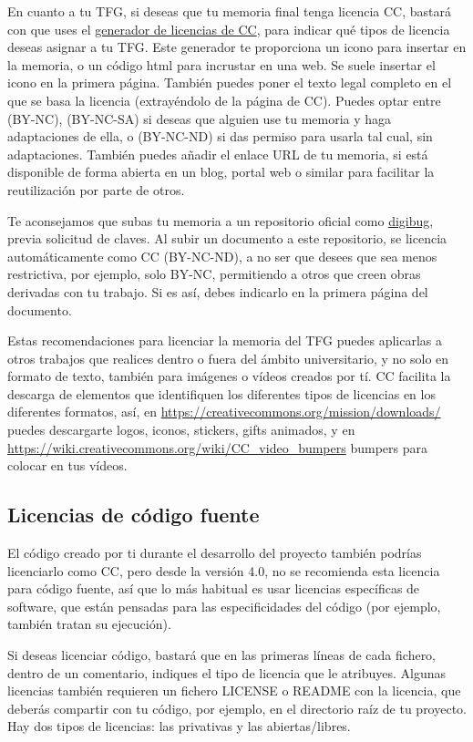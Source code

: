 
En cuanto a tu TFG, si deseas que tu memoria final tenga licencia CC, bastará con que uses el \href{https://chooser-beta.creativecommons.org/}{generador de licencias de CC}, para indicar qué tipos de licencia deseas asignar a tu TFG. Este generador te proporciona un icono para insertar en la memoria, o un código html para incrustar en una web. Se suele insertar el icono en la primera página. También puedes poner el texto legal completo en el que se basa la licencia (extrayéndolo de la página de CC). Puedes optar entre (BY-NC), (BY-NC-SA) si deseas que alguien use tu memoria y haga adaptaciones de ella, o (BY-NC-ND) si das permiso para usarla tal cual, sin adaptaciones. También puedes añadir el enlace URL de tu memoria, si está disponible de forma abierta en un blog, portal web o similar para facilitar la reutilización por parte de otros. 

Te aconsejamos que subas tu memoria a un repositorio oficial como \href{https://digibug.ugr.es/password-login}{digibug}, previa solicitud de claves. Al subir un documento a este repositorio, se licencia automáticamente como CC (BY-NC-ND), a no ser que desees que sea menos restrictiva, por ejemplo, solo BY-NC, permitiendo a otros que creen obras derivadas con tu trabajo. Si es así, debes indicarlo en la primera página del documento. 

Estas recomendaciones para licenciar la memoria del TFG puedes aplicarlas a otros trabajos que realices dentro o fuera del ámbito universitario, y no solo en formato de texto, también para imágenes o vídeos creados por tí. CC facilita la descarga de elementos que identifiquen los diferentes tipos de licencias en los diferentes formatos, así, en \url{https://creativecommons.org/mission/downloads/} puedes descargarte logos, iconos, stickers, gifts animados, y en \url{https://wiki.creativecommons.org/wiki/CC_video_bumpers} bumpers para colocar en tus vídeos.

\subsection{Licencias de código fuente}

El código creado por ti durante el desarrollo del proyecto también podrías licenciarlo como CC, pero desde la versión 4.0, no se recomienda esta licencia para código fuente, así que lo más habitual es usar licencias específicas de software, que están pensadas para las especificidades del código (por ejemplo, también tratan su  ejecución). 

Si deseas licenciar código, bastará que en las primeras líneas de cada fichero, dentro de un comentario, indiques el tipo de licencia que le atribuyes. Algunas licencias también requieren un fichero LICENSE o README con la licencia, que deberás compartir con tu código, por ejemplo, en el directorio raíz de tu proyecto. Hay dos tipos de licencias: las privativas y las abiertas/libres.

